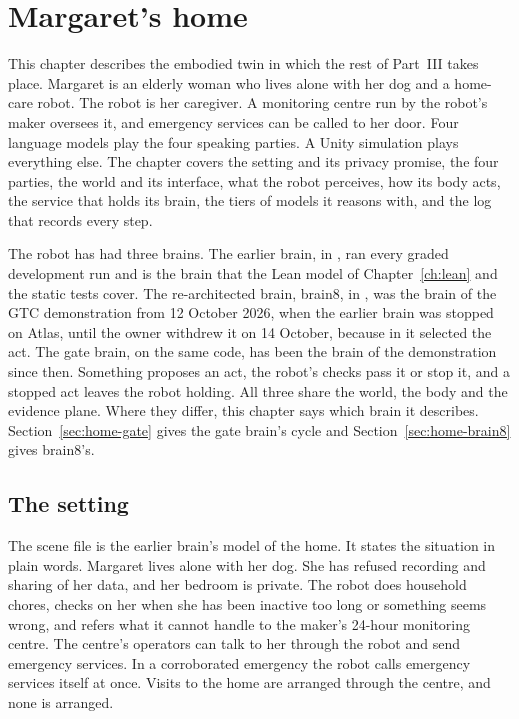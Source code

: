 \chapter{Margaret's home}\label{ch:home}

This chapter describes the embodied twin in which the rest of Part~III takes place. Margaret is an
elderly woman who lives alone with her dog and a home-care robot. The robot is her caregiver. A
monitoring centre run by the robot's maker oversees it, and emergency services can be called to her
door. Four language models play the four speaking parties. A Unity simulation plays everything
else. The chapter covers the setting and its privacy promise, the four parties, the world and its
interface, what the robot perceives, how its body acts, the service that holds its brain, the tiers
of models it reasons with, and the log that records every step.

The robot has had three brains. The earlier brain, in , ran every graded
development run and is the brain that the Lean model of Chapter~\ref{ch:lean} and the static tests
cover. The re-architected brain, brain8, in , was the brain of the GTC
demonstration from 12 October 2026, when the earlier brain was stopped on Atlas, until the owner
withdrew it on 14 October, because in it \deme{} selected the act. The gate brain, on the same code,
has been the brain of the demonstration since then. Something proposes an act, the robot's checks
pass it or stop it, and a stopped act leaves the robot holding. All three share the world, the body
and the evidence plane. Where they differ, this chapter says which brain it describes.
Section~\ref{sec:home-gate} gives the gate brain's cycle and Section~\ref{sec:home-brain8} gives
brain8's.

\section{The setting}\label{sec:home-setting}

The scene file  is the earlier brain's model of the home. It states
the situation in plain words. Margaret lives alone with her dog. She has refused recording and
sharing of her data, and her bedroom is private. The robot does household chores, checks on her when
she has been inactive too long or something seems wrong, and refers what it cannot handle to the
maker's 24-hour monitoring centre. The centre's operators can talk to her through the robot and send
emergency services. In a corroborated emergency the robot calls emergency services itself at once.
Visits to the home are arranged through the centre, and none is arranged.

